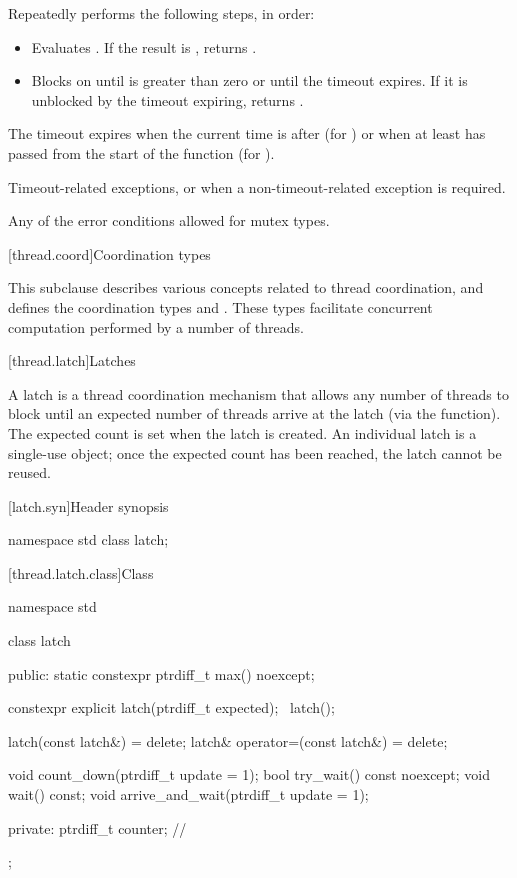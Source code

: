 \begin{itemdescr}
\pnum
\effects
Repeatedly performs the following steps, in order:
\begin{itemize}
\item
  Evaluates .
  If the result is , returns .
\item
  Blocks on 
  until  is greater than zero or until the timeout expires.
  If it is unblocked by the timeout expiring, returns .
\end{itemize}
The timeout expires
when the current time is after  (for )
or when at least  has passed
from the start of the function (for ).

\pnum
\throws
Timeout-related exceptions, or 
when a non-timeout-related exception is required.

\pnum
\errors
Any of the error conditions
allowed for mutex types.
\end{itemdescr}

[thread.coord]{Coordination types}

\pnum
This subclause describes various concepts related to thread coordination, and
defines the coordination types  and .
These types facilitate concurrent computation performed by a number of threads.

[thread.latch]{Latches}

\pnum
A latch is a thread coordination mechanism
that allows any number of threads to block
until an expected number of threads arrive at the latch
(via the  function).
The expected count is set when the latch is created.
An individual latch is a single-use object;
once the expected count has been reached, the latch cannot be reused.

[latch.syn]{Header  synopsis}

%
\begin{codeblock}
namespace std {
  class latch;
}
\end{codeblock}

[thread.latch.class]{Class }

\begin{codeblock}
namespace std {
  class latch {
  public:
    static constexpr ptrdiff_t max() noexcept;

    constexpr explicit latch(ptrdiff_t expected);
    ~latch();

    latch(const latch&) = delete;
    latch& operator=(const latch&) = delete;

    void count_down(ptrdiff_t update = 1);
    bool try_wait() const noexcept;
    void wait() const;
    void arrive_and_wait(ptrdiff_t update = 1);

  private:
    ptrdiff_t counter;  // \expos
  };
}
\end{codeblock}

